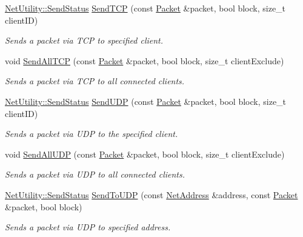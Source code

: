 \begin{DoxyCompactItemize}
\hyperlink{class_net_utility_a8051eca61204ffd818281419bbf44736}{NetUtility::SendStatus} \hyperlink{class_net_instance_server_afeec2cbabcb1b21ec634506a91712d61}{SendTCP} (const \hyperlink{class_packet}{Packet} \&packet, bool block, size\_\-t clientID)
\begin{DoxyCompactList}\small\item\em Sends a packet via TCP to specified client. \item\end{DoxyCompactList}\item 
void \hyperlink{class_net_instance_server_a29f1868afb448ee9f6aa2aacdfbc34d2}{SendAllTCP} (const \hyperlink{class_packet}{Packet} \&packet, bool block, size\_\-t clientExclude)
\begin{DoxyCompactList}\small\item\em Sends a packet via TCP to all connected clients. \item\end{DoxyCompactList}\item 
\hyperlink{class_net_utility_a8051eca61204ffd818281419bbf44736}{NetUtility::SendStatus} \hyperlink{class_net_instance_server_af8e4f5fcae8def947487282b5d217d5d}{SendUDP} (const \hyperlink{class_packet}{Packet} \&packet, bool block, size\_\-t clientID)
\begin{DoxyCompactList}\small\item\em Sends a packet via UDP to the specified client. \item\end{DoxyCompactList}\item 
void \hyperlink{class_net_instance_server_afe73616d1530e5fb6a440a80c5649f5d}{SendAllUDP} (const \hyperlink{class_packet}{Packet} \&packet, bool block, size\_\-t clientExclude)
\begin{DoxyCompactList}\small\item\em Sends a packet via UDP to all connected clients. \item\end{DoxyCompactList}\item 
\hyperlink{class_net_utility_a8051eca61204ffd818281419bbf44736}{NetUtility::SendStatus} \hyperlink{class_net_instance_server_a7447476c3b949378488c3b5c6cb11a5b}{SendToUDP} (const \hyperlink{class_net_address}{NetAddress} \&address, const \hyperlink{class_packet}{Packet} \&packet, bool block)
\begin{DoxyCompactList}\small\item\em Sends a packet via UDP to specified address. \item\end{DoxyCompactList}\item 

\end{DoxyCompactItemize}
